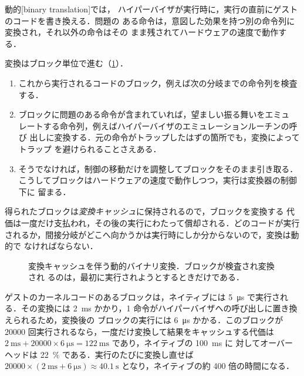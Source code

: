 \documentclass[../main.tex]{subfiles}
\begin{document}
\begin{definition}[バイナリ変換]
  動的[binary translation]では，
  ハイパーバイザが実行時に，実行の直前にゲストのコードを書き換える．問題の
  ある命令は，意図した効果を持つ別の命令列に変換され，それ以外の命令はその
  まま残されてハードウェアの速度で動作する．
\end{definition}

変換はブロック単位で進む（\cref{fig:l12-bt}）．
\begin{enumerate}
  \item これから実行されるコードのブロック，例えば次の分岐までの命令列を検査
    する．
  \item ブロックに問題のある命令が含まれていれば，望ましい振る舞いをエミュ
    レートする命令列，例えばハイパーバイザのエミュレーションルーチンの呼び
    出しに変換する．元の命令がトラップしたはずの箇所でも，変換によってトラップ
    を避けられることさえある．
  \item そうでなければ，制御の移動だけを調整してブロックをそのまま引き取る．
    こうしてブロックはハードウェアの速度で動作しつつ，実行は変換器の制御下に
    留まる．
\end{enumerate}
得られたブロックは\emph{変換キャッシュ}に保持されるので，ブロックを変換する
代価は一度だけ支払われ，その後の実行にわたって償却される．どのコードが実行
されるか，間接分岐がどこへ向かうかは実行時にしか分からないので，変換は動的で
なければならない．

\begin{figure}[htbp]
  \centering
  
  \caption{変換キャッシュを伴う動的バイナリ変換．ブロックが検査され変換され
    るのは，最初に実行されようとするときだけである．}
  \label{fig:l12-bt}
\end{figure}

\begin{example}
  ゲストのカーネルコードのあるブロックは，ネイティブには
  \SI{5}{\micro\second} で実行される．その変換には \SI{2}{\milli\second}
  かかり，1 命令がハイパーバイザへの呼び出しに置き換えられるため，変換後の
  ブロックの実行には \SI{6}{\micro\second} かかる．このブロックが
  \num{20000} 回実行されるなら，一度だけ変換して結果をキャッシュする代価は
  $\SI{2}{\milli\second} + \num{20000}\times\SI{6}{\micro\second} =
  \SI{122}{\milli\second}$ であり，ネイティブの \SI{100}{\milli\second} に
  対してオーバーヘッドは \SI{22}{\percent} である．実行のたびに変換し直せば
  $\num{20000}\times(\SI{2}{\milli\second}+\SI{6}{\micro\second}) \approx
  \SI{40.1}{\second}$ となり，ネイティブの約 400 倍の時間になる．
\end{example}
\end{document}
